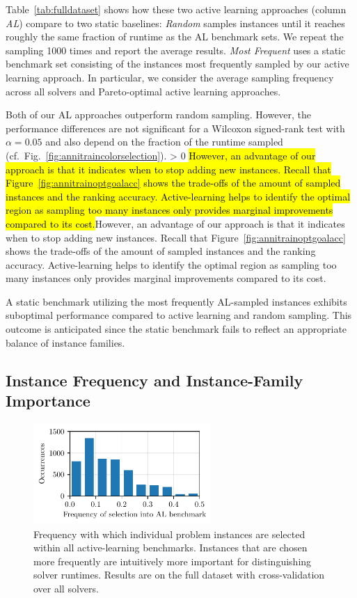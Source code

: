 \documentclass[sn-basic, Numbered]{sn-jnl} %
\newcommand{\showchanges}{1} %
\newcommand{\change}[1]{\ifnum \showchanges > 0 \sethlcolor{yellow}\hl{#1}\else#1\fi}
\begin{document}
Table~\ref{tab:fulldataset} shows how these two active learning approaches (column \emph{AL}) compare to two static baselines:
\emph{Random} samples instances until it reaches roughly the same fraction of runtime as the AL benchmark sets.
We repeat the sampling 1000 times and report the average results.
\emph{Most Frequent} uses a static benchmark set consisting of the instances most frequently sampled by our active learning approach.
In particular, we consider the average sampling frequency across all solvers and Pareto-optimal active learning approaches.

Both of our AL approaches outperform random sampling.
However, the performance differences are not significant for a Wilcoxon signed-rank test with $\alpha = 0.05$ and also depend on the fraction of the runtime sampled (cf.~Fig.~\ref{fig:annitraincolorselection}).
\change{However, an advantage of our approach is that it indicates when to stop adding new instances.
Recall that Figure~\ref{fig:annitrainoptgoalacc} shows the trade-offs of the amount of sampled instances and the ranking accuracy.
Active-learning helps to identify the optimal region as sampling too many instances only provides marginal improvements compared to its cost.}

A static benchmark utilizing the most frequently AL-sampled instances exhibits suboptimal performance compared to active learning and random sampling.
This outcome is anticipated since the static benchmark fails to reflect an appropriate balance of instance families.

\subsection{Instance Frequency and Instance-Family Importance}
\label{sec:eval:instance}

\begin{figure}[tbp]
  \centering
  \includegraphics[width=0.6\textwidth]{plots/instoccs.pdf}
  \caption{Frequency with which individual problem instances are selected within all active-learning benchmarks. Instances that are chosen more frequently are intuitively more important for distinguishing solver runtimes. Results are on the full dataset with cross-validation over all solvers.}
  \label{fig:instoccs}
\end{figure}
\end{document}
